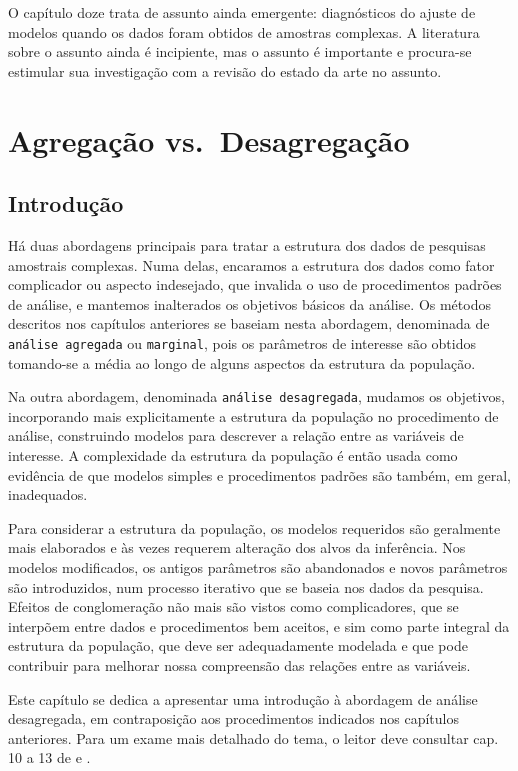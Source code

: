\documentclass[]{book}
\numberwithin{example}{chapter}
\numberwithin{remark}{chapter}
\numberwithin{definition}{chapter}
\begin{document}
O capítulo doze trata de assunto ainda emergente: diagnósticos do ajuste
de modelos quando os dados foram obtidos de amostras complexas. A
literatura sobre o assunto ainda é incipiente, mas o assunto é
importante e procura-se estimular sua investigação com a revisão do
estado da arte no assunto.

\chapter{Agregação vs.~Desagregação}\label{agregdesag}

\section{Introdução}\label{introducao-7}

Há duas abordagens principais para tratar a estrutura dos dados de
pesquisas amostrais complexas. Numa delas, encaramos a estrutura dos
dados como fator complicador ou aspecto indesejado, que invalida o uso
de procedimentos padrões de análise, e mantemos inalterados os objetivos
básicos da análise. Os métodos descritos nos capítulos anteriores se
baseiam nesta abordagem, denominada de \texttt{análise\ agregada} ou
\texttt{marginal}, pois os parâmetros de interesse são obtidos
tomando-se a média ao longo de alguns aspectos da estrutura da
população.

Na outra abordagem, denominada \texttt{análise\ desagregada}, mudamos os
objetivos, incorporando mais explicitamente a estrutura da população no
procedimento de análise, construindo modelos para descrever a relação
entre as variáveis de interesse. A complexidade da estrutura da
população é então usada como evidência de que modelos simples e
procedimentos padrões são também, em geral, inadequados.

Para considerar a estrutura da população, os modelos requeridos são
geralmente mais elaborados e às vezes requerem alteração dos alvos da
inferência. Nos modelos modificados, os antigos parâmetros são
abandonados e novos parâmetros são introduzidos, num processo iterativo
que se baseia nos dados da pesquisa. Efeitos de conglomeração não mais
são vistos como complicadores, que se interpõem entre dados e
procedimentos bem aceitos, e sim como parte integral da estrutura da
população, que deve ser adequadamente modelada e que pode contribuir
para melhorar nossa compreensão das relações entre as variáveis.

Este capítulo se dedica a apresentar uma introdução à abordagem de
análise desagregada, em contraposição aos procedimentos indicados nos
capítulos anteriores. Para um exame mais detalhado do tema, o leitor
deve consultar cap. 10 a 13 de \citep{Sk89a} e \citep{bryk}.
\end{document}

